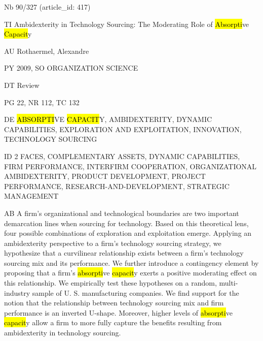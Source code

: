 \documentclass[a4paper]{article}
\begin{document}
\vspace*{-2cm}
Nb \tabto{0cm}90/327 (article\_id: 417)\par
TI \tabto{0cm}Ambidexterity in Technology Sourcing: The Moderating Role of \hl{Absorpti}ve \hl{Capacit}y\par
AU \tabto{0cm}Rothaermel, Alexandre\par
PY \tabto{0cm}2009, SO ORGANIZATION SCIENCE\par
DT \tabto{0cm}Review\par
PG \tabto{0cm}22, NR 112, TC 132\par
DE \tabto{0cm}\hl{ABSORPTI}VE \hl{CAPACIT}Y, AMBIDEXTERITY, DYNAMIC CAPABILITIES, EXPLORATION AND EXPLOITATION, INNOVATION, TECHNOLOGY SOURCING\par
ID \tabto{0cm}2 FACES, COMPLEMENTARY ASSETS, DYNAMIC CAPABILITIES, FIRM PERFORMANCE, INTERFIRM COOPERATION, ORGANIZATIONAL AMBIDEXTERITY, PRODUCT DEVELOPMENT, PROJECT PERFORMANCE, RESEARCH-AND-DEVELOPMENT, STRATEGIC MANAGEMENT\par
AB \tabto{0cm}A firm's organizational and technological boundaries are two important demarcation lines when sourcing for technology. Based on this theoretical lens, four possible combinations of exploration and exploitation emerge. Applying an ambidexterity perspective to a firm's technology sourcing strategy, we hypothesize that a curvilinear relationship exists between a firm's technology sourcing mix and its performance. We further introduce a contingency element by proposing that a firm's \hl{absorpti}ve \hl{capacit}y exerts a positive moderating effect on this relationship. We empirically test these hypotheses on a random, multi-industry sample of U. S. manufacturing companies. We find support for the notion that the relationship between technology sourcing mix and firm performance is an inverted U-shape. Moreover, higher levels of \hl{absorpti}ve \hl{capacit}y allow a firm to more fully capture the benefits resulting from ambidexterity in technology sourcing.\par
\clearpage
\end{document}

